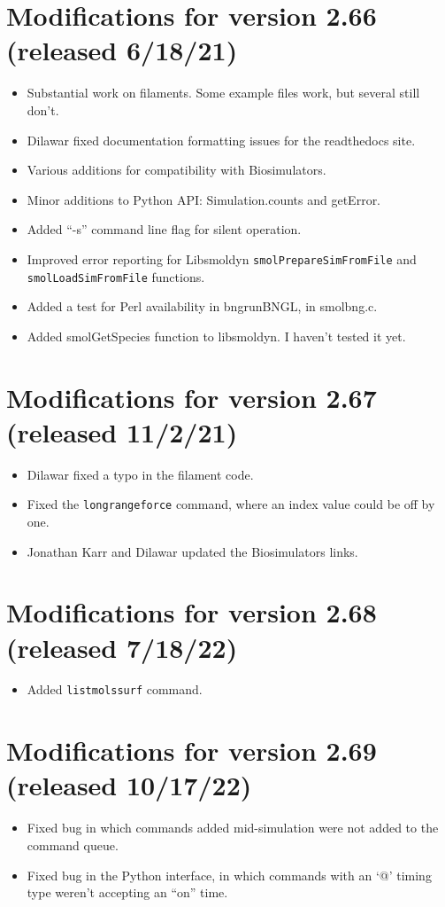 \documentclass {scrbook}
\newcommand {\ttt} {\texttt}
\begin{document}
\section{Modifications for version 2.66 (released 6/18/21)}
\begin{itemize}
\item Substantial work on filaments. Some example files work, but several still don't.
\item Dilawar fixed documentation formatting issues for the readthedocs site.
\item Various additions for compatibility with Biosimulators.
\item Minor additions to Python API: Simulation.counts and getError.
\item Added ``-s'' command line flag for silent operation.
\item Improved error reporting for Libsmoldyn \ttt{smolPrepareSimFromFile} and \ttt{smolLoadSimFromFile} functions.
\item Added a test for Perl availability in bngrunBNGL, in smolbng.c.
\item Added smolGetSpecies function to libsmoldyn. I haven't tested it yet.
\end{itemize}

\section{Modifications for version 2.67 (released 11/2/21)}
\begin{itemize}
\item Dilawar fixed a typo in the filament code.
\item Fixed the \ttt{longrangeforce} command, where an index value could be off by one.
\item Jonathan Karr and Dilawar updated the Biosimulators links.
\end{itemize}

\section{Modifications for version 2.68 (released 7/18/22)}
\begin{itemize}
\item Added \ttt{listmolssurf} command.
\end{itemize}

\section{Modifications for version 2.69 (released 10/17/22)}
\begin{itemize}
\item Fixed bug in which commands added mid-simulation were not added to the command queue.
\item Fixed bug in the Python interface, in which commands with an `@' timing type weren't accepting an ``on'' time.
\end{itemize}
\end{document}
